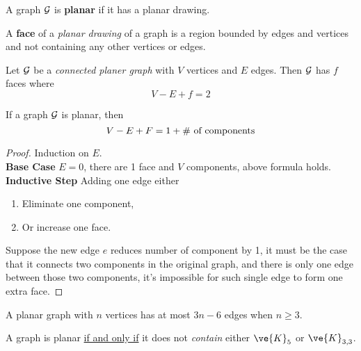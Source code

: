 \documentclass{article}
\begin{document}
			\begin{definition}
				A graph $\mathcal{{G}}$ is \textbf{planar} if it has a planar drawing.
			\end{definition}
			
			\begin{definition}
				A \textbf{face} of a \emph{planar drawing} of a graph is a region bounded by edges and vertices and not containing any other vertices or edges.
			\end{definition}

			\begin{theorem}
				Let $\mathcal{{G}}$ be a \emph{connected planer graph} with $V$ vertices and $E$ edges. Then $\mathcal{{G}}$ has $f$ faces where 
				\begin{equation}
					V - E + f = 2
				\end{equation}
			\end{theorem}
			
			\begin{theorem}
				If a graph $\mathcal{{G}}$ is planar, then
				\begin{equation}
					V - E + F = 1 + \text{{\# of components}}
				\end{equation}
				\begin{proof}
					Induction on $E$.\\
					\textbf{Base Case} $E=0$, there are 1 face and $V$ components, above formula holds. \\
					\textbf{Inductive Step} Adding one edge either
					\begin{enumerate}
						\item Eliminate one component,
						\item Or increase one face.
					\end{enumerate}
					Suppose the new edge $e$ reduces number of component by 1, it must be the case that it connects two components in the original graph, and there is only one edge between those two components, it's impossible for such single edge to form one extra face.
				\end{proof}
			\end{theorem}
			
			\begin{theorem}
				A planar graph with $n$ vertices has at most $3n - 6$ edges when $n \geq 3$.
			\end{theorem}
			
			\begin{theorem}
				A graph is planar \ul{if and only if} it does not \emph{contain} either $\ve{K}_5$ or $\ve{K}_{3,3}$.
			\end{theorem}
			
\end{document}
